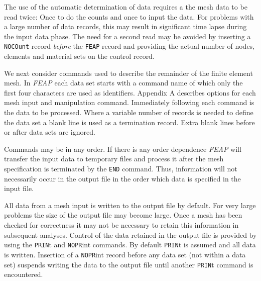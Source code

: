 The use of the automatic determination of data requires a the mesh data
to be read twice: Once to do the counts and once to input the data.
For problems with a large number of data records,
this may result in significant time lapse during the input data phase.
The need for a second read may be avoided by inserting a {\tt NOCOunt}
record {\it before} the {\tt FEAP} record and providing the actual number of
nodes, elements and material sets on the control record.

We next consider commands used to describe the remainder of the finite
element mesh.  In {\sl FEAP} each data set starts with a command name
of which only the first four characters are used as identifiers.
Appendix A describes options for each mesh input and manipulation command.
Immediately following each command is the data to be processed.  Where 
a variable number of records is needed to define the data set a blank
line is used as a termination record.  Extra blank lines before or after
data sets are ignored.

Commands may be in any order.  If there is any order dependence {\sl FEAP}
will transfer the input data to temporary files and process it after the
mesh specification is terminated by the {\tt END} command.  Thus, information
will not necessarily occur in the output file in the order which data is
specified in the input file.

All data from a mesh input is written to the output file by default.  For very
large problems the size of the output file may become large.  Once a mesh
has been checked for correctness it may not be necessary to retain this
information in subsequent analyses.  Control of the data retained in the
output file is provided by using the {\tt PRIN}t and {\tt NOPR}int commands.
By default {\tt PRIN}t is assumed and all data is written.  Insertion of a
{\tt NOPR}int record before any data set (not within a data set) suspends
writing the data to the output file until another {\tt PRIN}t command is
encountered.
